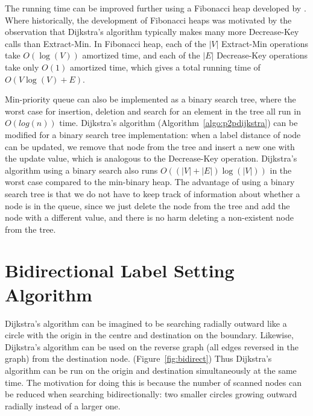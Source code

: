 The running time can be improved further using a Fibonacci heap
developed by \citet{Fredman}.
Where historically, the development of Fibonacci heaps was motivated by the observation that Dijkstra's algorithm typically makes many more Decrease-Key calls than Extract-Min.
In Fibonacci heap, each of the $|V|$ Extract-Min operations take $O(\log(V))$ amortized time,
and each of the $|E|$ Decrease-Key operations take only $O(1)$ amortized time,
which gives a total running time of $O(V\log(V)+E)$.

Min-priority queue can also be implemented as a binary search tree,
where the worst case for insertion, deletion and search for an element in the tree all run in $O(log(n))$ time.
Dijkstra's algorithm (Algorithm~\ref{algo:p2pdijkstra}) can be modified for a binary search tree implementation: when a label distance of node can be updated, we remove that node from the tree and insert a new one with the update value, which is analogous to the Decrease-Key operation.
Dijkstra's algorithm using a binary search also runs $O((|V|+|E|)\log(|V|))$ in the worst case compared to the min-binary heap.
The advantage of using a binary search tree is that we do not have to keep track of information about whether a node is in the queue,
since we just delete the node from the tree and add the node with a different value, and there is no harm deleting a non-existent node from the tree.

\section{Bidirectional Label Setting Algorithm} \label{section:bidirectional}
Dijkstra's algorithm can be imagined to be searching radially outward like a circle with the origin in the centre and destination on the boundary.
Likewise, Dijkstra's algorithm can be used on the reverse graph (all edges reversed in the graph) from the destination node.
(Figure~\ref{fig:bidirect})
Thus Dijkstra's algorithm can be run on the origin and destination simultaneously at the same time.
The motivation for doing this is because the number of scanned nodes can be reduced when searching bidirectionally:
two smaller circles growing outward radially instead of a larger one.

